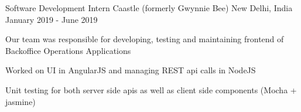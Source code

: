 


\begin{cventries}


\cventry
{Software Development Intern} %
{Caastle (formerly Gwynnie Bee)} %
{New Delhi, India} %
{January 2019 - June 2019} %
{ %
\begin{cvitems}
\item {Our team was responsible for developing, testing and maintaining frontend of Backoffice Operations Applications}
\item {Worked on UI in AngularJS and managing REST api calls in NodeJS}
\item {Unit testing for both server side apis as well as client side components (Mocha + jasmine)}
\end{cvitems}
}


\end{cventries}
